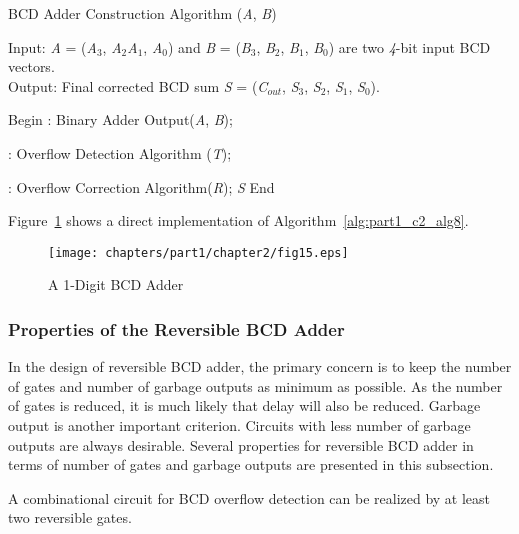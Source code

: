 \begin{algorithm}[!tbh]
	\caption{BCD Adder Construction Algorithm ({\it A}, {\it B})}
	\label{alg:part1_c2_alg8}
	Input: {\it A }= ({\it A}${}_{3}$, {\it A}${}_{2}${\it A}${}_{1}$, {\it A}${}_{0}$) and {\it B }= ({\it B}${}_{3}$, {\it B}${}_{2}$, {\it B}${}_{1}$, {\it B}${}_{0}$) are two {\it 4}-bit input BCD vectors.\\
	Output: Final corrected BCD sum {\it S }= ({\it C}${}_{out}$, {\it S}${}_{3}$, {\it S}${}_{2}$, {\it S}${}_{1}$, {\it S}${}_{0}$).\\
	\begin{algorithmic}[1]
		\STATE Begin
		: Binary Adder Output({\it A}, {\it B});
		
		: Overflow Detection Algorithm ({\it T});
		
		: Overflow Correction Algorithm({\it R});
		 {\it S}
		\STATE End
	\end{algorithmic}
\end{algorithm}

\begin{example}\textnormal{	Figure~\ref{fig:p1_c2_fig15} shows a direct implementation of Algorithm~\ref{alg:part1_c2_alg8}.}
\end{example}

\begin{figure}[!tbh]
	\centering
	\texttt{[image: chapters/part1/chapter2/fig15.eps]}
	\caption{A 1-Digit BCD Adder}
	\label{fig:p1_c2_fig15}
\end{figure}

\subsubsection{Properties of the Reversible BCD Adder}

In the design of reversible BCD adder, the primary concern is to keep the number of gates and number of garbage outputs as minimum as possible. As the number of gates is reduced, it is much likely that delay will also be reduced. Garbage output is another important criterion. Circuits with less number of garbage outputs are always desirable. Several properties for reversible BCD adder in terms of number of gates and garbage outputs are presented in this subsection.
\begin{property}\label{p_c2_l_3}\textnormal{
	A combinational circuit for BCD overflow detection can be realized by at least two reversible gates.}
\end{property}


